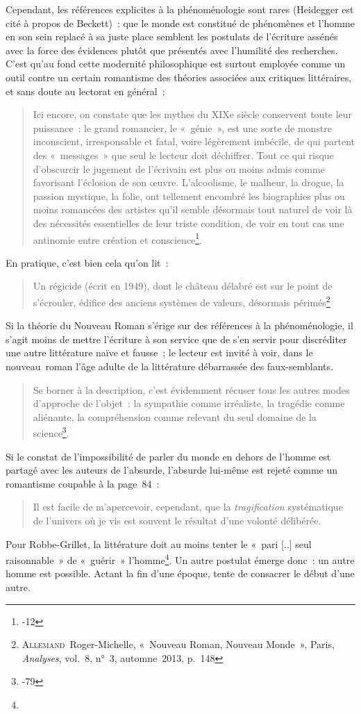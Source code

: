 \documentclass[12pt, a4paper]{article}
\begin{document}
Cependant, les références explicites à la phénoménologie sont rares (Heidegger est cité à propos de Beckett)~: que le monde est constitué de phénomènes et l'homme en son sein replacé à sa juste place semblent les postulats de l'écriture assénés avec la force des évidences plutôt que présentés avec l'humilité des recherches. C'est qu'au fond cette modernité philosophique est surtout employée comme un outil contre un certain romantisme des théories associées aux critiques littéraires, et sans doute au lectorat en général~:
\begin{quote}
    Ici encore, on constate que les mythes du XIXe siècle conservent toute leur puissance~: le grand romancier, le «~génie~», est une sorte de monstre inconscient, irresponsable et fatal, voire légèrement imbécile, de qui partent des «~messages~» que seul le lecteur doit déchiffrer. Tout ce qui risque d’obscurcir le jugement de l’écrivain est plus ou moins admis comme favorisant l’éclosion de son œuvre. L’alcoolisme, le malheur, la drogue, la passion mystique, la folie, ont tellement encombré les biographies plus ou moins romancées des artistes qu’il semble désormais tout naturel de voir là des nécessités essentielles de leur triste condition, de voir en tout cas une antinomie entre création et conscience\footnote{-12}.
\end{quote}
En pratique, c'est bien cela qu'on lit~:
\begin{quote}
    Un régicide (écrit en 1949), dont le château délabré est sur le
point de s’écrouler, édifice des anciens systèmes de valeurs,
désormais périmés\footnote{\textsc{Allemand}~Roger-Michelle, «~Nouveau Roman, Nouveau Monde~», Paris, \textit{Analyses}, vol.~8, n°~3, automne~2013, p.~148}
\end{quote}

Si la théorie du Nouveau Roman s'érige sur des références à la phénoménologie, il s'agit moins de mettre l'écriture à son service que de s'en servir pour discréditer une autre littérature naïve et fausse~; le lecteur est invité à voir, dans le nouveau~roman l'âge adulte de la littérature débarrassée des faux-semblants.
\begin{quote}
    Se borner à la description, c’est évidemment récuser tous les autres modes d’approche de l’objet~: la sympathie comme irréaliste, la tragédie comme aliénante, la compréhension comme relevant du seul domaine de la science\footnote{-79}.
\end{quote}

Si le constat de l'impossibilité de parler du monde en dehors de l'homme est partagé avec les auteurs de l'absurde, l'absurde lui-même est rejeté comme un romantisme coupable à la page~84~:
\begin{quote}
    Il est facile de m’apercevoir, cependant, que la \textit{tragification} systématique de l’univers où je vis est souvent le résultat d’une volonté délibérée.
\end{quote}
Pour Robbe-Grillet, la littérature doit au moins tenter le «~pari [..] seul raisonnable~» de «~guérir~» l'homme\footnote{}. Un autre postulat émerge donc~: un autre homme est possible. Actant la fin d'une époque, \punr{} tente de consacrer le début d'une autre.
\end{document}
